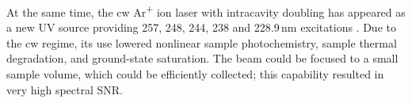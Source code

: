 At the same time, the cw Ar\textsuperscript{+} ion laser with intracavity
doubling has appeared as a new UV source providing 257, 248, 244, 238 and
228.9\,nm excitations
\parencite{%
	Asher1993b,%
	Russell1995%
}.
Due to the cw regime, its use lowered nonlinear sample photochemistry, sample
thermal degradation, and ground-state saturation.
The beam could be focused to a small sample volume, which could be efficiently
collected; this capability resulted in very high spectral SNR.
